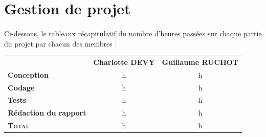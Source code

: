 \documentclass[french,12pt,a4paper,titlepage]{article}
\begin{document}
\newpage

\section{Gestion de projet}
\paragraph{} Ci-dessous, le tableaux récapitulatif du nombre d'heures passées sur chaque partie du projet par chacun des membres :\\
\newline
\newline
{}
\begin{tabular}[c]{lcc}
	&	\textbf{Charlotte DEVY}	&	\textbf{Guillaume RUCHOT}	\\
\textbf{Conception}	&	h	&	h	\\
\textbf{Codage}	&	h	&	h	\\
\textbf{Tests}	&	h	&	h	\\
\textbf{Rédaction du rapport}	&	h	&	h	\\
\textbf{\scshape Total}	&	h	&	h	\\
\end{tabular}

\newpage
\end{document}
